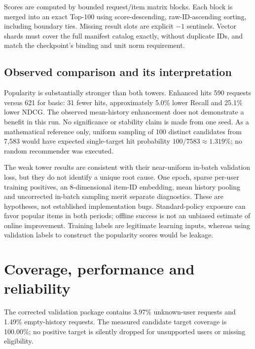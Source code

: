 \documentclass[11pt,a4paper]{article}
\begin{document}
Scores are computed by bounded request/item matrix blocks. Each block is merged into an exact Top-100 using score-descending, raw-ID-ascending sorting, including boundary ties. Missing result slots are explicit $-1$ sentinels. Vector shards must cover the full manifest catalog exactly, without duplicate IDs, and match the checkpoint's binding and unit norm requirement.
\subsection{Observed comparison and its interpretation}
Popularity is substantially stronger than both towers. Enhanced hits 590 requests versus 621 for basic: 31 fewer hits, approximately 5.0\% lower Recall and 25.1\% lower NDCG. The observed mean-history enhancement does not demonstrate a benefit in this run. No significance or stability claim is made from one seed. As a mathematical reference only, uniform sampling of 100 distinct candidates from 7,583 would have expected single-target hit probability $100/7583\approx1.319\%$; no random recommender was executed.

The weak tower results are consistent with their near-uniform in-batch validation loss, but they do not identify a unique root cause. One epoch, sparse per-user training positives, an 8-dimensional item-ID embedding, mean history pooling and uncorrected in-batch sampling merit separate diagnostics. These are hypotheses, not established implementation bugs. Standard-policy exposure can favor popular items in both periods; offline success is not an unbiased estimate of online improvement. Training labels are legitimate learning inputs, whereas using validation labels to construct the popularity scores would be leakage.
\clearpage
\section{Coverage, performance and reliability}
The corrected validation package contains 3.97\% unknown-user requests and 1.49\% empty-history requests. The measured candidate target coverage is 100.00\%; no positive target is silently dropped for unsupported users or missing eligibility.
\end{document}
